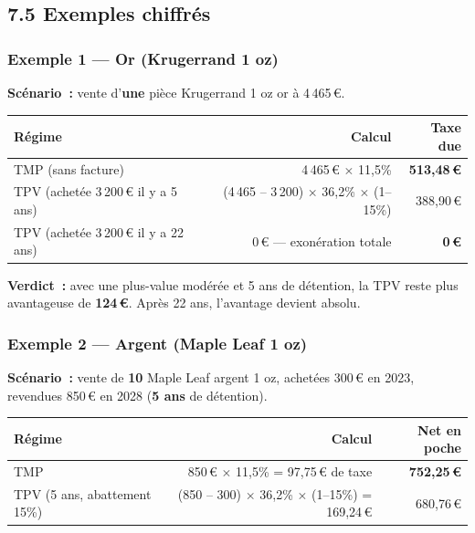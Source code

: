 \documentclass[14pt,a4paper]{extarticle}
\begin{document}
\newpage

\subsection{7.5 Exemples chiffrés}

\subsubsection*{Exemple 1 --- Or (Krugerrand 1 oz)}

\textbf{Scénario~:} vente d'\textbf{une} pièce Krugerrand 1 oz or à 4\,465\,€.

\begin{center}
\begin{tabular}{lrr}
\toprule
\textbf{Régime} & \textbf{Calcul} & \textbf{Taxe due} \\
\midrule
TMP (sans facture) & 4\,465\,€ $\times$ 11,5\% & \textbf{513,48\,€} \\
TPV (achetée 3\,200\,€ il y a 5 ans) & (4\,465 -- 3\,200) $\times$ 36,2\% $\times$ (1--15\%) & 388,90\,€ \\
TPV (achetée 3\,200\,€ il y a 22 ans) & 0\,€ --- exonération totale & \textbf{0\,€} \\
\bottomrule
\end{tabular}
\end{center}

\textbf{Verdict~:} avec une plus-value modérée et 5 ans de détention, la TPV reste plus avantageuse de \textbf{124\,€}. Après 22 ans, l'avantage devient absolu.

\subsubsection*{Exemple 2 --- Argent (Maple Leaf 1 oz)}

\textbf{Scénario~:} vente de \textbf{10} Maple Leaf argent 1 oz, achetées 300\,€ en 2023, revendues 850\,€ en 2028 (\textbf{5 ans} de détention).

\begin{center}
\begin{tabular}{lrr}
\toprule
\textbf{Régime} & \textbf{Calcul} & \textbf{Net en poche} \\
\midrule
TMP & 850\,€ $\times$ 11,5\% = 97,75\,€ de taxe & \textbf{752,25\,€} \\
TPV (5 ans, abattement 15\%) & (850 -- 300) $\times$ 36,2\% $\times$ (1--15\%) = 169,24\,€ & 680,76\,€ \\
\bottomrule
\end{tabular}
\end{center}
\end{document}
